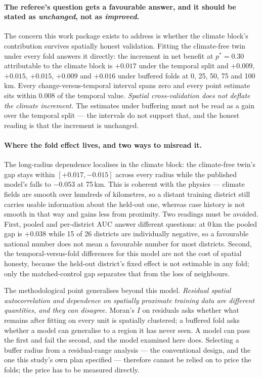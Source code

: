 \paragraph{The referee's question gets a favourable answer, and it should be stated as \emph{unchanged}, not as \emph{improved}.} The concern this work package exists to address is whether the climate block's contribution survives spatially honest validation. Fitting the climate-free twin under every fold answers it directly: the increment in net benefit at $p^*=0.30$ attributable to the climate block is $+0.017$ under the temporal split and $+0.009$, $+0.015$, $+0.015$, $+0.009$ and $+0.016$ under buffered folds at 0, 25, 50, 75 and 100\,km. Every change-versus-temporal interval spans zero and every point estimate sits within 0.008 of the temporal value. \emph{Spatial cross-validation does not deflate the climate increment.} The estimates under buffering must not be read as a gain over the temporal split --- the intervals do not support that, and the honest reading is that the increment is unchanged.

\paragraph{Where the fold effect lives, and two ways to misread it.} The long-radius dependence localises in the climate block: the climate-free twin's gap stays within $[+0.017, -0.015]$ across every radius while the published model's falls to $-0.053$ at 75\,km. This is coherent with the physics --- climate fields are smooth over hundreds of kilometres, so a distant training district still carries usable information about the held-out one, whereas case history is not smooth in that way and gains less from proximity. Two readings must be avoided. First, pooled and per-district AUC answer different questions: at 0\,km the pooled gap is $+0.038$ while 15 of 26 districts are individually negative, so a favourable national number does not mean a favourable number for most districts. Second, the temporal-versus-fold differences for this model are not the cost of spatial honesty, because the held-out district's fixed effect is not estimable in any fold; only the matched-control gap separates that from the loss of neighbours.

The methodological point generalises beyond this model. \emph{Residual spatial autocorrelation and dependence on spatially proximate training data are different quantities, and they can disagree.} Moran's $I$ on residuals asks whether what remains after fitting on every unit is spatially clustered; a buffered fold asks whether a model can generalise to a region it has never seen. A model can pass the first and fail the second, and the model examined here does. Selecting a buffer radius from a residual-range analysis --- the conventional design, and the one this study's own plan specified --- therefore cannot be relied on to price the folds; the price has to be measured directly.


